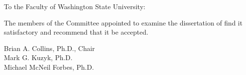 {\doublespacing\setlength{\parskip}{0pt}
\noindent To the Faculty of Washington State University:\par
The members of the Committee appointed to examine the dissertation of \MakeUppercase{\thesisauthor} find it satisfactory and recommend that it be accepted.\par
{\raggedleft
Brian A. Collins, Ph.D., Chair\\
Mark G. Kuzyk, Ph.D.\\
Michael McNeil Forbes, Ph.D.\par}
}
\clearpage
